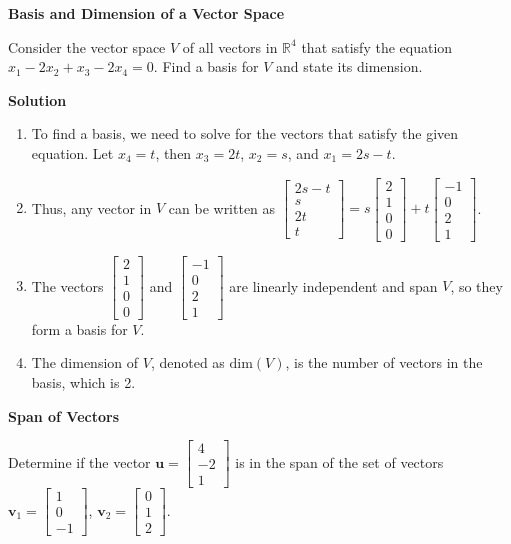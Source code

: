 \documentclass[8pt, a4paper, landscape]{extarticle}
\begin{document}
\begin{multicols*}{4}
  \textbf{Basis and Dimension of a Vector Space}

  Consider the vector space $V$ of all vectors in $\mathbb{R}^4$ that satisfy the equation $x_1 - 2x_2 + x_3 - 2x_4 = 0$. Find a basis for $V$ and state its dimension.
  
  \textbf{Solution}

  \begin{enumerate}
    \item To find a basis, we need to solve for the vectors that satisfy the given equation. Let $x_4 = t$, then $x_3 = 2t$, $x_2 = s$, and $x_1 = 2s - t$.
    \item Thus, any vector in $V$ can be written as $\begin{bmatrix} 2s - t \\ s \\ 2t \\ t \end{bmatrix} = s\begin{bmatrix} 2 \\ 1 \\ 0 \\ 0 \end{bmatrix} + t\begin{bmatrix} -1 \\ 0 \\ 2 \\ 1 \end{bmatrix}$.
    \item The vectors $\begin{bmatrix} 2 \\ 1 \\ 0 \\ 0 \end{bmatrix}$ and $\begin{bmatrix} -1 \\ 0 \\ 2 \\ 1 \end{bmatrix}$ are linearly independent and span $V$, so they form a basis for $V$.
    \item The dimension of $V$, denoted as $\text{dim}(V)$, is the number of vectors in the basis, which is 2.
  \end{enumerate}

  \textbf{Span of Vectors}

  Determine if the vector $\mathbf{u} = \begin{bmatrix} 4 \\ -2 \\ 1 \end{bmatrix}$ is in the span of the set of vectors $\mathbf{v}_1 = \begin{bmatrix} 1 \\ 0 \\ -1 \end{bmatrix}$, $\mathbf{v}_2 = \begin{bmatrix} 0 \\ 1 \\ 2 \end{bmatrix}$.
  

\end{multicols*}
\end{document}
